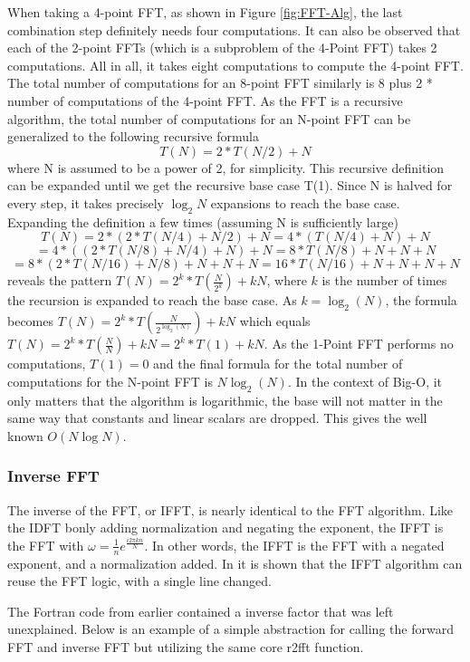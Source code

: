 When taking a 4-point FFT, as shown in Figure \ref{fig:FFT-Alg}, the last combination step definitely needs four computations. It can also be observed that each of the 2-point FFTs (which is a subproblem of the 4-Point FFT) takes 2 computations. All in all, it takes eight computations to compute the 4-point FFT. The total number of computations for an 8-point FFT similarly is 8 plus 2 * number of computations of the 4-point FFT. As the FFT is a recursive algorithm, the total number of computations for an N-point FFT can be generalized to the following recursive formula
$$T(N) = 2*T(N/2) + N$$
where N is assumed to be a power of 2, for simplicity. This recursive definition can be expanded
until we get the recursive base case T(1). Since N is halved for every step, it takes precisely $\log_2 N$ expansions to reach the base case. Expanding the definition a few times (assuming N is sufficiently large)
$$T(N) = 2*(2*T(N/4) + N/2) + N = 4*(T(N/4) + N) + N$$
$$= 4*((2*T(N/8)+N/4) + N) + N = 8*T(N/8) + N + N + N$$
$$= 8*(2*T(N/16) + N/8) + N + N + N = 16*T(N/16) + N + N + N + N$$
reveals the pattern $T(N) = 2^k*T(\frac{N}{2^k}) + kN$, where $k$ is the number of times the recursion is expanded to reach the base case. As $k =\log_2(N)$, the formula becomes $T(N) = 2^k*T(\frac{N}{2^{\log_2(N)}}) + kN$ which equals $T(N) = 2^k*T(\frac{N}{N}) + kN = 2^k * T(1) + kN$. As the 1-Point FFT performs no computations, $T(1) = 0$ and the final formula for the total number of computations for the N-point FFT is $N \log_2(N)$. In the context of Big-O, it only matters that the algorithm is logarithmic, the base will not matter in the same way that constants and linear scalars are dropped. This gives the well known $O(N\log N)$.

\subsubsection{Inverse FFT}
The inverse of the FFT, or IFFT, is nearly identical to the FFT algorithm. Like the IDFT bonly adding normalization and negating the exponent, the IFFT is the FFT  with $\omega = \frac{1}{n}e^{\frac{i2\pi kn}{N}}$. In other words, the IFFT is the FFT with a negated exponent, and a normalization added. In \cite{Reducible2020} it is shown that the IFFT algorithm can reuse the FFT logic, with a single line changed. 

The Fortran code from earlier contained a inverse factor that was left unexplained. Below is an example of a simple abstraction for calling the forward FFT and inverse FFT but utilizing the same core r2fft function.


